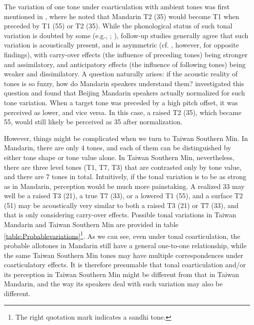 \documentclass[12pt]{report}
\begin{document}
\begin{CJK}{UTF8}{bsmi}

The variation of one tone under coarticulation with ambient tones was first mentioned in \cite{Chao1968}, where he noted that Mandarin T2 (35) would become T1 when preceded by T1 (55) or T2 (35). While the phonological status of such tonal variation is doubted by some (e.g., \citealp{ShihSproat1992}; \citealp{Xu1994}), follow-up studies generally agree that such variation is acoustically present, and is asymmetric (cf. \citealp{Shen1990}, however, for opposite findings), with carry-over effects (the influence of preceding tones) being stronger and assimilatory, and anticipatory effects (the influence of following tones) being weaker and dissimilatory. A question naturally arises: if the acoustic reality of tones is so fuzzy, how do Mandarin speakers understand them? \cite{Xu1997} investigated this question and found that Beijing Mandarin speakers actually normalized for such tone variation. When a target tone was preceded by a high pitch offset, it was perceived as lower, and vice versa. In this case, a raised T2 (35), which became 55, would still likely be perceived as 35 after normalization.

However, things might be complicated when we turn to Taiwan Southern Min. In Mandarin, there are only 4 tones, and each of them can be distinguished by either tone shape or tone value alone. In Taiwan Southern Min, nevertheless, there are three level tones (T1, T7, T3) that are contrasted only by tone value, and there are 7 tones in total. Intuitively, if the tonal variation is to be as strong as in Mandarin, perception would be much more painstaking. A realized 33 may well be a raised T3 (21), a true T7 (33), or a lowered T1 (55), and a surface T2 (51) may be acoustically very similar to both a raised T3 (21) or T7 (33), and that is only considering carry-over effects. Possible tonal variations in Taiwan Mandarin and Taiwan Southern Min are provided in table \ref{table:Probablevariations}\footnote{The right quotation mark indicates a sandhi tone.}. As we can see, even under tonal coarticulation, the probable allotones in Mandarin still have a general one-to-one relationship, while the same Taiwan Southern Min tones may have multiple correspondences under coarticulatory effects. It is therefore presumable that tonal coarticulation and/or its perception in Taiwan Southern Min might be different from that in Taiwan Mandarin, and the way its speakers deal with such variation may also be different.


\end{CJK}
\end{document}
